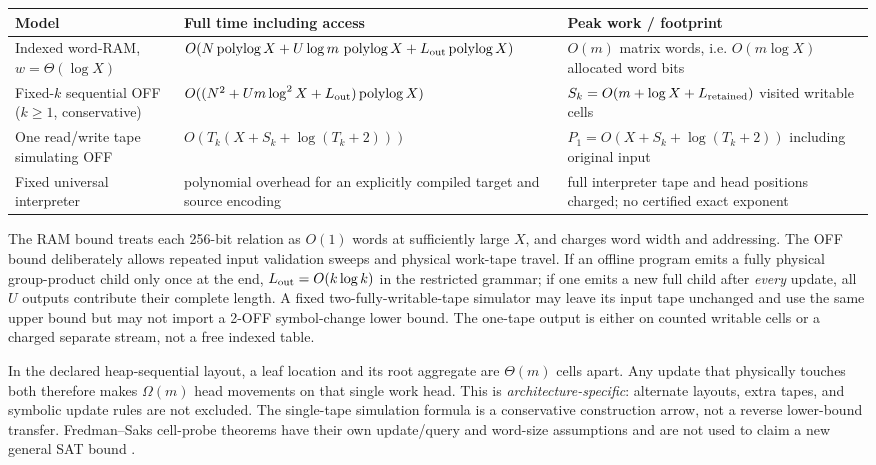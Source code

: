 \documentclass[11pt]{article}
\newcommand{\polylog}{\operatorname{polylog}}
\begin{document}
\begin{center}\small
\begin{tabular}{p{.22\linewidth}p{.39\linewidth}p{.29\linewidth}}
\toprule
Model & Full time including access & Peak work / footprint\\
\midrule
Indexed word-RAM, $w=\Theta(\log X)$ & $O(N\polylog X+U\log m\,\polylog X+L_{\rm out}\polylog X)$ & $O(m)$ matrix words, i.e. $O(m\log X)$ allocated word bits\\
Fixed-$k$ sequential OFF ($k\ge1$, conservative) & $O((N^2+Um\log^2 X+L_{\rm out})\polylog X)$ & $S_k=O(m+\log X+L_{\rm retained})$ visited writable cells\\
One read/write tape simulating OFF & $O(T_k(X+S_k+\log(T_k+2)))$ & $P_1=O(X+S_k+\log(T_k+2))$ including original input\\
Fixed universal interpreter & polynomial overhead for an explicitly compiled target and source encoding & full interpreter tape and head positions charged; no certified exact exponent\\
\bottomrule
\end{tabular}
\end{center}
The RAM bound treats each 256-bit relation as $O(1)$ words at sufficiently large $X$, and charges word width and addressing. The OFF bound deliberately allows repeated input validation sweeps and physical work-tape travel. If an offline program emits a fully physical group-product child only once at the end, $L_{\rm out}=O(k\log k)$ in the restricted grammar; if one emits a new full child after \emph{every} update, all $U$ outputs contribute their complete length. A fixed two-fully-writable-tape simulator may leave its input tape unchanged and use the same upper bound but may not import a 2-OFF symbol-change lower bound. The one-tape output is either on counted writable cells or a charged separate stream, not a free indexed table.

In the declared heap-sequential layout, a leaf location and its root aggregate are $\Theta(m)$ cells apart. Any update that physically touches both therefore makes $\Omega(m)$ head movements on that single work head. This is \emph{architecture-specific}: alternate layouts, extra tapes, and symbolic update rules are not excluded. The single-tape simulation formula is a conservative construction arrow, not a reverse lower-bound transfer. Fredman--Saks cell-probe theorems have their own update/query and word-size assumptions and are not used to claim a new general SAT bound \cite{fredmansaks}.
\end{document}
